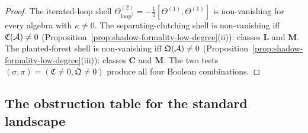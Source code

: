 \begin{proof}
The iterated-loop shell
$\Theta^{(2)}_{\mathrm{loop}^2} =
-\frac{1}{2}[\Theta^{(1)}, \Theta^{(1)}]$
is non-vanishing for every algebra with $\kappa \neq 0$.
The separating-clutching shell is non-vanishing iff
$\mathfrak{C}(\mathcal{A}) \neq 0$
(Proposition~\ref{prop:shadow-formality-low-degree}(ii)):
classes $\mathbf{L}$ and $\mathbf{M}$.
The planted-forest shell is non-vanishing iff
$\mathfrak{Q}(\mathcal{A}) \neq 0$
(Proposition~\ref{prop:shadow-formality-low-degree}(iii)):
classes $\mathbf{C}$ and $\mathbf{M}$.
The two tests $(\sigma, \pi) =
(\mathfrak{C} \neq 0, \mathfrak{Q} \neq 0)$ produce all
four Boolean combinations.
\end{proof}



\subsection{The obstruction table for the standard landscape}
\label{subsec:thqg-obstruction-table}


